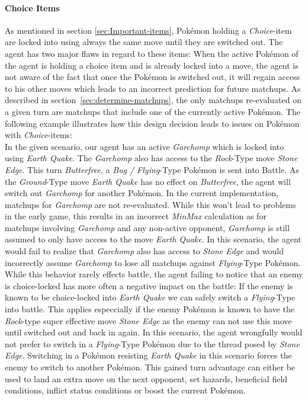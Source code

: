 \paragraph{Choice Items}
As mentioned in section \ref{sec:Important-items}, Pokémon holding a \textit{Choice}-item are locked into using always 
the same move until they are switched out. The agent has two major flaws in regard to these items: When the active
Pokémon of the agent is holding a choice item and is already locked into a move, the agent is not aware of the fact that
once the Pokémon is switched out, it will regain access to his other moves which leads to an incorrect prediction
for future matchups. As described in section~\ref{sec:determine-matchups}, the only matchups re-evaluated
on a given turn are matchups that include one of the currently active Pokémon. The following example illustrates how
this design decision leads to issues on Pokémon with \textit{Choice}-items: \\
In the given scenario, our agent has an active \textit{Garchomp} which is locked into using \textit{Earth Quake}. The 
\textit{Garchomp} also has access to the \textit{Rock}-Type move \textit{Stone Edge}. This turn \textit{Butterfree},
a \textit{Bug / Flying}-Type Pokémon
is sent into Battle. As the \textit{Ground}-Type move \textit{Earth Quake} has no effect on \textit{Butterfree}, the agent will
switch out \textit{Garchomp} for another Pokémon. In the current implementation, matchups for \textit{Garchomp} are not
re-evaluated. While this won't lead to problems in the early game, this results in an incorrect \textit{MinMax} calculation
as for matchups involving \textit{Garchomp} and any non-active opponent, \textit{Garchomp} is still assumed to only have
access to the move \textit{Earth Quake}. In this scenario, the agent would fail to realize that \textit{Garchomp} also
has access to \textit{Stone Edge} and would incorrectly assume \textit{Garchomp} to lose all matchups against \textit{Flying}-Type
Pokémon. \\
While this behavior rarely effects battle, the agent failing to notice that an enemy is choice-locked has more often a 
negative impact on the battle: If the enemy is known to be choice-locked into \textit{Earth Quake} we can safely switch 
a \textit{Flying}-Type into battle. This applies especcially if the enemy Pokémon is known to have the \textit{Rock}-type 
super effective
move \textit{Stone Edge} as the enemy can not use this move until switched out and back in again. In this scenario, the
agent wrongfully would not prefer to switch in a \textit{Flying}-Type Pokémon due to the thread posed by 
\textit{Stone Edge}. Switching in a Pokémon resisting \textit{Earth Quake} in this scenario forces the enemy to switch
to another Pokémon. This gained turn advantage can either be used to land an extra move on the next opponent, set hazards,
beneficial field conditions, inflict status conditions or boost the current Pokémon.

